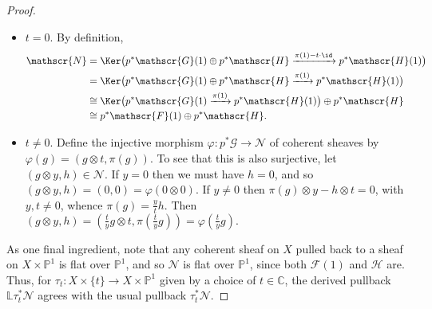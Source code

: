 \begin{proof}
        \begin{itemize}
            \item $t=0$.
                By definition,
                \begin{align*}
                    \mathscr{N} &= \Ker\big(p^*\mathscr{G}(1)\oplus p^*\mathscr{H}\xrightarrow{\pi(1)-t\cdot\id}p^*\mathscr{H}(1)\big)\\
                    &= \Ker\big(p^*\mathscr{G}(1)\oplus p^*\mathscr{H}\xrightarrow{\pi(1)}p^*\mathscr{H}(1)\big)\\
                    &\cong \Ker\big(p^*\mathscr{G}(1)\xrightarrow{\pi(1)}p^*\mathscr{H}(1)\big) \oplus p^*\mathscr{H}\\
                    &\cong p^*\mathscr{F}(1)\oplus p^*\mathscr{H}.
                \end{align*}
            \item $t\neq0$.
                Define the injective morphism $\varphi\colon p^*\mathscr{G}\to\mathscr{N}$ of coherent sheaves by $\varphi(g)=(g\otimes t,\pi(g))$.
                To see that this is also surjective, let $(g\otimes y, h)\in\mathscr{N}$.
                If $y=0$ then we must have $h=0$, and so $(g\otimes y, h) = (0,0) = \varphi(0\otimes0)$.
                If $y\neq0$ then $\pi(g)\otimes y-h\otimes t=0$, with $y,t\neq0$, whence $\pi(g)=\frac{y}{t}h$.
                Then $(g\otimes y, h) = (\frac{t}{y}g\otimes t, \pi(\frac{t}{y}g)) = \varphi(\frac{t}{y}g).$
        \end{itemize}

        As one final ingredient, note that any coherent sheaf on $X$ pulled back to a sheaf on $X\times\mathbb{P}^1$ is flat over $\mathbb{P}^1$, and so $\mathscr{N}$ is flat over $\mathbb{P}^1$, since both $\mathscr{F}(1)$ and $\mathscr{H}$ are.
        Thus, for $\tau_t\colon X\times\{t\}\to X\times\mathbb{P}^1$ given by a choice of $t\in\mathbb{C}$, the derived pullback $\mathbb{L}\tau_t^*\mathscr{N}$ agrees with the usual pullback $\tau_t^*\mathscr{N}$.


\end{proof}
